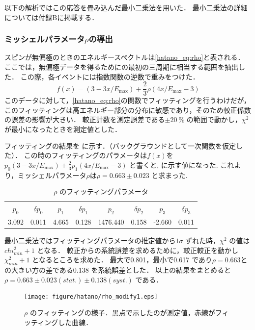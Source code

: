 以下の解析ではこの応答を畳み込んだ最小二乗法を用いた．
最小二乗法の詳細については付録Bに掲載する．

\subsubsection{ミッシェルパラメータ$\rho$の導出}
スピンが無偏極のときのエネルギースペクトルは\eqref{hatano_eq:rho}と表される．
ここでは，無偏極データを得るためにの最初の三周期に相当する範囲を抽出した．
この際，各イベントには指数関数の逆数で重みをつけた．
\begin{equation}
  f(x)=(3 - 3x / E_\mathrm{max})+\frac{2}{3}\rho(4x / E_\mathrm{max} - 3)
  \label{hatano_eq:rho}
\end{equation}
このデータに対して，\eqref{hatano_eq:rho}の関数でフィッティングを行うわけだが，このフィッティングは高エネルギー部分の分布に敏感であり，そのため較正係数の誤差の影響が大きい．
較正計数を測定誤差である$\pm 20~\%$ の範囲で動かし，$\chi^2$ が最小になったときを測定値とした．

フィッティングの結果を に示す．（バックグラウンドとして一次関数を仮定した）．
この時のフィッティングのパラメータは$f(x)$を$p_0(3 - 3x / E_\mathrm{max}) + \frac{2}{3} p_{1} (4x / E_\mathrm{max} - 3)$ と書くと, に示す値になった.
これより，ミッシェルパラメータ$\rho$は$\rho=0.663 \pm 0.023$ と求まった.

\begin{table}[hbt]
\centering
\caption{$\rho$ のフィッティングパラメータ}
\begin{tabular}{cc|cc|cc|cc}
$p_0$ & $\delta p_0$ & $p_1$ & $\delta p_1$ & $p_2$ & $\delta p_2$ & $p_3$ & $\delta p_3$ \\ \hline
3.092 & 0.011 & 4.665 & 0.128 & 1476.440 & 0.158 & -2.660 & 0.011
\end{tabular}
\label{hatano_tab:rho}
\end{table}

最小二乗法ではフィッティングパラメータの推定値から$1\sigma$ ずれた時，$\chi^2$ の値は$chi^2_{min}+1$ となる．\cite{leo} 
較正からの系統誤差を求めるために，較正較正を動かし$\chi^{2}_{min} + 1$ となるところを求めた．
最大で0.801，最小で0.617 であり$\rho=0.663$との大きい方の差である0.138 を系統誤差とした．
以上の結果をまとめると$\rho=0.663 \pm 0.023 (stat.) \pm 0.138 (syst.)$ である．

\begin{figure}[hbt]
\centering
\texttt{[image: figure/hatano/rho\_modify1.eps]}
\caption{$\rho$ のフィッティングの様子．黒点で示したのが測定値，赤線がフィッティングした曲線．}
\label{hatano_fig:rho}
\end{figure}

